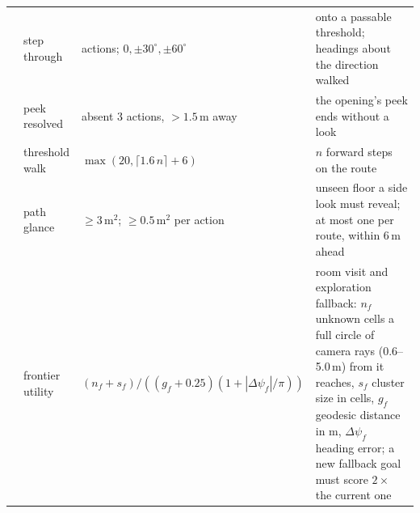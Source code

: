 \documentclass[10pt]{article}
\begin{document}
\begin{table}[p]
\begin{tabular}{@{}>{\raggedright\arraybackslash}p{1.9cm}>{\raggedright\arraybackslash}p{3.1cm}>{\raggedright\arraybackslash}p{3.8cm}>{\raggedright\arraybackslash}p{5.6cm}@{}}
 & step through & 8 actions; $0, \pm 30^\circ, \pm 60^\circ$ & onto a passable threshold; headings about the direction walked \\
 & peek resolved & absent 3 actions, $> 1.5$\,m away & the opening's peek ends without a look \\
 & threshold walk & $\max(20, \lceil 1.6\,n \rceil + 6)$ & $n$ forward steps on the route \\
 & path glance & $\ge 3$\,m$^2$; $\ge 0.5$\,m$^2$ per action & unseen floor a side look must reveal; at most one per route, within 6\,m ahead \\
 & frontier utility & $(n_f + s_f) / ((g_f + 0.25)(1 + |\Delta\psi_f|/\pi))$ & room visit and exploration fallback: $n_f$ unknown cells a full circle of camera rays (0.6--5.0\,m) from it reaches, $s_f$ cluster size in cells, $g_f$ geodesic distance in m, $\Delta\psi_f$ heading error; a new fallback goal must score $2\times$ the current one \\
\bottomrule
\end{tabular}
\end{table}
\end{document}

